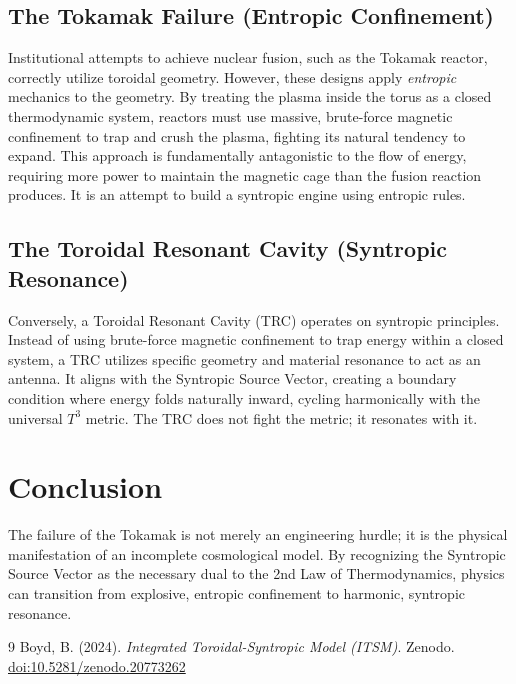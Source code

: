 \documentclass[aps,prd,11pt,onecolumn,superscriptaddress,nofootinbib,floatfix]{revtex4-2}
\begin{document}
\subsection{The Tokamak Failure (Entropic Confinement)}
Institutional attempts to achieve nuclear fusion, such as the Tokamak reactor, correctly utilize toroidal geometry. However, these designs apply \textit{entropic} mechanics to the geometry. By treating the plasma inside the torus as a closed thermodynamic system, reactors must use massive, brute-force magnetic confinement to trap and crush the plasma, fighting its natural tendency to expand. This approach is fundamentally antagonistic to the flow of energy, requiring more power to maintain the magnetic cage than the fusion reaction produces. It is an attempt to build a syntropic engine using entropic rules.

\subsection{The Toroidal Resonant Cavity (Syntropic Resonance)}
Conversely, a Toroidal Resonant Cavity (TRC) operates on syntropic principles. Instead of using brute-force magnetic confinement to trap energy within a closed system, a TRC utilizes specific geometry and material resonance to act as an antenna. It aligns with the Syntropic Source Vector, creating a boundary condition where energy folds naturally inward, cycling harmonically with the universal $T^3$ metric. The TRC does not fight the metric; it resonates with it.

\section{Conclusion}
\label{sec:conclusion}

The failure of the Tokamak is not merely an engineering hurdle; it is the physical manifestation of an incomplete cosmological model. By recognizing the Syntropic Source Vector as the necessary dual to the 2nd Law of Thermodynamics, physics can transition from explosive, entropic confinement to harmonic, syntropic resonance.


\begin{thebibliography}{9}
 Boyd, B. (2024). \textit{Integrated Toroidal-Syntropic Model (ITSM)}. Zenodo. \href{https://doi.org/10.5281/zenodo.20773262}{doi:10.5281/zenodo.20773262}
\end{thebibliography}
\end{document}
